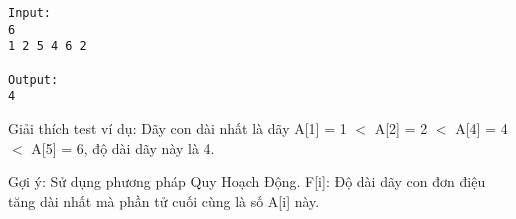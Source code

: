 \begin{verbatim}
Input:
6
1 2 5 4 6 2 

Output:
4
\end{verbatim}

       Giải thích test ví dụ:      Dãy con dài nhất là dãy A[1] = 1 $<$ A[2] = 2 $<$ A[4] = 4 $<$ A[5] = 6, độ dài dãy này là 4.  

       Gợi ý:      Sử dụng phương pháp Quy Hoạch Động. F[i]: Độ dài dãy con đơn điệu tăng dài nhất mà phần tử cuối cùng là số A[i] này.